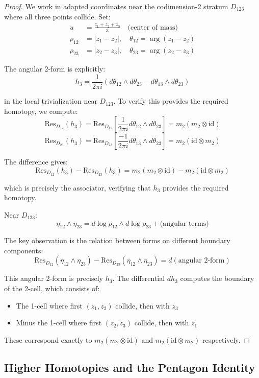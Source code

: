 \begin{proof}
We work in adapted coordinates near the codimension-2 stratum $D_{123}$ where all three points collide.
Set:
\begin{align}
u &= \frac{z_1 + z_2 + z_3}{3} \quad \text{(center of mass)} \\
\rho_{12} &= |z_1 - z_2|, \quad \theta_{12} = \arg(z_1 - z_2) \\
\rho_{23} &= |z_2 - z_3|, \quad \theta_{23} = \arg(z_2 - z_3)
\end{align}

The angular 2-form is explicitly:
$$h_3 = \frac{1}{2\pi i}(d\theta_{12} \wedge d\theta_{23} - d\theta_{13} \wedge d\theta_{23})$$

in the local trivialization near $D_{123}$. To verify this provides the required homotopy, we compute:
$$\text{Res}_{D_{12}}(h_3) = \text{Res}_{D_{12}}\left[\frac{1}{2\pi i}d\theta_{12} \wedge d\theta_{23}\right] = m_2(m_2 \otimes \text{id})$$
$$\text{Res}_{D_{23}}(h_3) = \text{Res}_{D_{23}}\left[\frac{-1}{2\pi i}d\theta_{13} \wedge d\theta_{23}\right] = m_2(\text{id} \otimes m_2)$$

The difference gives:
$$\text{Res}_{D_{12}}(h_3) - \text{Res}_{D_{23}}(h_3) = m_2(m_2 \otimes \text{id}) - m_2(\text{id} \otimes m_2)$$

which is precisely the associator, verifying that $h_3$ provides the required homotopy.
 
Near $D_{123}$:
\[
\eta_{12} \wedge \eta_{23} = d\log\rho_{12} \wedge d\log\rho_{23} + \text{(angular terms)}
\]
 
The key observation is the relation between forms on different boundary components:
\[
\text{Res}_{D_{12}}(\eta_{12} \wedge \eta_{23}) - \text{Res}_{D_{23}}(\eta_{12} \wedge \eta_{23}) 
= d(\text{angular 2-form})
\]
 
This angular 2-form is precisely $h_3$. The differential $dh_3$ computes the boundary of the 2-cell,
which consists of:
\begin{itemize}
\item The 1-cell where first $(z_1,z_2)$ collide, then with $z_3$
\item Minus the 1-cell where first $(z_2,z_3)$ collide, then with $z_1$
\end{itemize}
 
These correspond exactly to $m_2(m_2 \otimes \text{id})$ and $m_2(\text{id} \otimes m_2)$ respectively.
\end{proof}
 
\subsection{Higher Homotopies and the Pentagon Identity}
 
